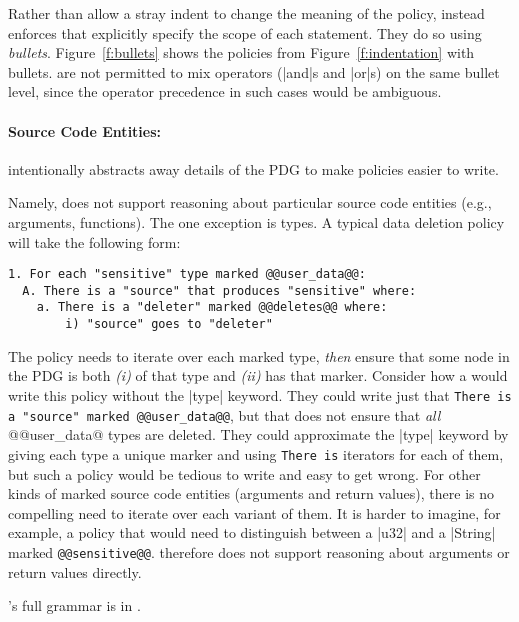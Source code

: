 Rather than allow a stray indent to change the meaning of the policy,
\syslang{} instead enforces that \ces{} explicitly specify the scope of each statement.
%
They do so using \emph{bullets}.
%
Figure~\ref{f:bullets} shows the policies from Figure~\ref{f:indentation} with \syslang{} bullets.
%
\Ces{} are not permitted to mix operators (|and|s and |or|s) on the same bullet level,
since the operator precedence in such cases would be ambiguous.

\paragraph{Source Code Entities: }
\syslang{} intentionally abstracts away details of the PDG to make policies easier to write.

Namely, \syslang{} does not support reasoning about particular source code entities (e.g., arguments, functions).
%
The one exception is types.
%
%
A typical data deletion policy will take the following form:
\begin{lstlisting}[language=CNL]
1. For each "sensitive" type marked @@user_data@@:
  A. There is a "source" that produces "sensitive" where:
    a. There is a "deleter" marked @@deletes@@ where:
        i) "source" goes to "deleter"
\end{lstlisting}
The policy needs to iterate over each marked type,
\emph{then} ensure that some node in the PDG is both \emph{(i)} of that type
and \emph{(ii)} has that marker.
%
Consider how a \ce{} would write this policy without the |type| keyword.
%
They could write just that \lstinline[language=CNL]|There is a "source" marked @@user_data@@|,
but that does not ensure that \emph{all} @@user_data@ types are deleted.
%
They could approximate the |type| keyword by giving each type a unique marker and using \lstinline[language=CNL]|There is|
iterators for each of them, but such a policy would be tedious to write and easy to get wrong.
%
For other kinds of marked source code entities (arguments and return values),
there is no compelling need to iterate over each variant of them.
%
It is harder to imagine, for example, a policy that would need to distinguish between 
a |u32| and a |String| marked \lstinline[language=CNL]|@@sensitive@@|.
%
\syslang{} therefore does not support reasoning about arguments or return values directly.

\syslang{}'s full grammar is in .
